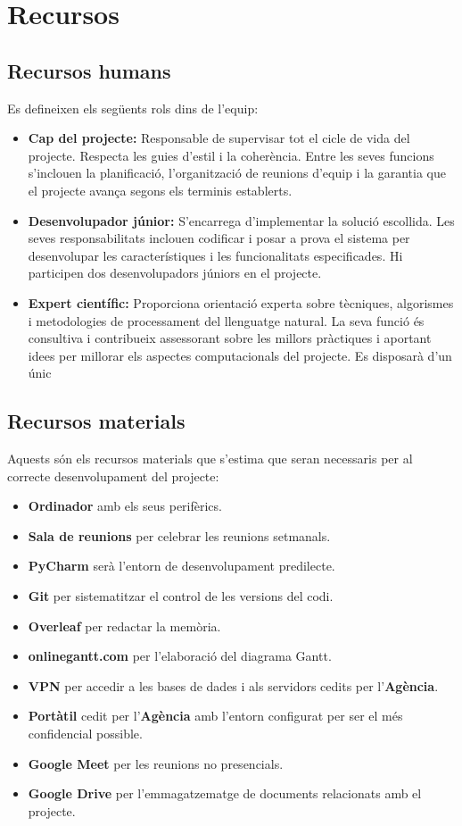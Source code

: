 \section{Recursos} \label{sec:recursos}

\subsection{Recursos humans}
Es defineixen els següents rols dins de l'equip:

\begin{itemize}
    \item \textbf{Cap del projecte:} Responsable de supervisar tot el cicle de vida del projecte. Respecta les guies d'estil i la coherència. Entre les seves funcions s'inclouen la planificació, l'organització de reunions d'equip i la garantia que el projecte avança segons els terminis establerts.
    \item \textbf{Desenvolupador júnior:} S'encarrega d'implementar la solució escollida. Les seves responsabilitats inclouen codificar i posar a prova el sistema per desenvolupar les característiques i les funcionalitats especificades. Hi participen dos desenvolupadors júniors en el projecte.
    \item \textbf{Expert científic:} Proporciona orientació experta sobre tècniques, algorismes i metodologies de processament del llenguatge natural. La seva funció és consultiva i contribueix assessorant sobre les millors pràctiques i aportant idees per millorar els aspectes computacionals del projecte. Es disposarà d'un únic 
\end{itemize}

\subsection{Recursos materials}
Aquests són els recursos materials que s'estima que seran necessaris per al correcte desenvolupament del projecte:

\begin{itemize}
    \item \textbf{Ordinador} amb els seus perifèrics.
    \item \textbf{Sala de reunions} per celebrar les reunions setmanals.
    \item \textbf{PyCharm} serà l'entorn de desenvolupament predilecte.
    \item \textbf{Git} per sistematitzar el control de les versions del codi.
    \item \textbf{Overleaf} per redactar la memòria.
    \item \textbf{onlinegantt.com} per l'elaboració del diagrama Gantt.
    \item \textbf{VPN} per accedir a les bases de dades i als servidors cedits per l'\textbf{Agència}.
    \item \textbf{Portàtil} cedit per l'\textbf{Agència} amb l'entorn configurat per ser el més confidencial possible.
    \item \textbf{Google Meet} per les reunions no presencials.
    \item \textbf{Google Drive} per l'emmagatzematge de documents relacionats amb el projecte.
\end{itemize}
